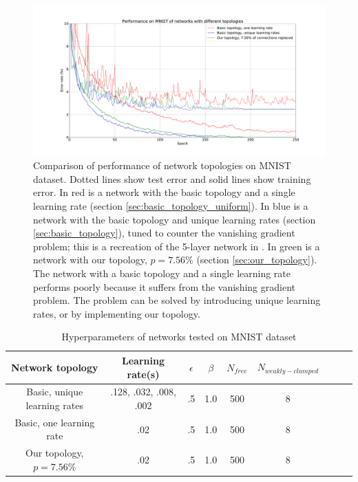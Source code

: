 \documentclass{article}
\begin{document}
\begin{figure}
  \centering
  \includegraphics[width=\textwidth]{figures/MNIST_network_comparison.pdf}
  \caption{Comparison of performance of network topologies on MNIST dataset. Dotted lines show test error and solid lines show training error. In red is a network with the basic topology and a single learning rate (section \ref{sec:basic_topology_uniform}). In blue is a network with the basic topology and unique learning rates (section \ref{sec:basic_topology}), tuned to counter the vanishing gradient problem; this is a recreation of the 5-layer network in \cite{scellier17}. In green is a network with our topology, $p=7.56\%$ (section \ref{sec:our_topology}). The network with a basic topology and a single learning rate performs poorly because it suffers from the vanishing gradient problem. The problem can be solved by introducing unique learning rates, or by implementing our topology.}
  \label{fig:mnist_comparison}
\end{figure}

\begin{table}
\begin{center}
\begin{tabular}{|c|c|c|c|c|c|c|c|c|}
\hline
Network topology & Learning rate(s) & $\epsilon$ & $\beta$ & $N_{free}$ & $N_{weakly-clamped}$\\\hline\hline
Basic, unique learning rates & .128, .032, .008, .002 & .5 & 1.0 & 500 & 8 \\\hline
Basic, one learning rate & .02 & .5 & 1.0 & 500 & 8  \\\hline
Our topology, $p=7.56\%$ & .02 & .5 & 1.0 & 500 & 8 \\\hline
\end{tabular}
\end{center}
\caption{Hyperparameters of networks tested on MNIST dataset}
\label{table:hyperparameters}
\end{table}
\end{document}
